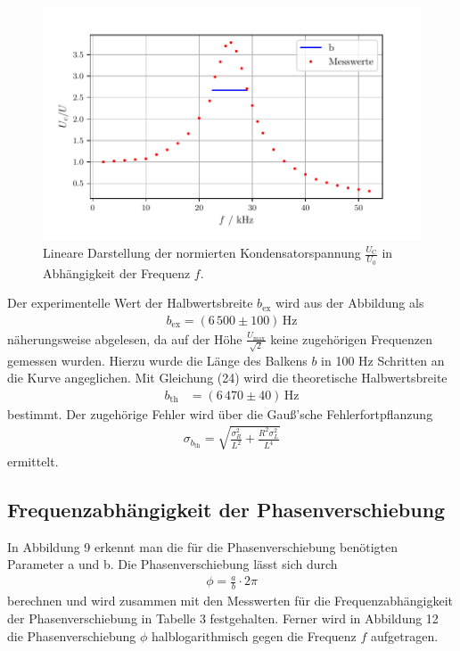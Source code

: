 \begin{figure}[H]
  \centering
  \includegraphics{plotc.pdf}
  \caption{Lineare Darstellung der normierten Kondensatorspannung $\frac{U_\text{C}}{U_\text{0}}$ in Abhängigkeit der Frequenz $f$.}
  \label{fig:Plot c}
\end{figure}

Der experimentelle Wert der Halbwertsbreite $b_\text{ex}$ wird aus der Abbildung als
\begin{align*}
b_\text{ex} = (6\,500 \pm 100)\,\si{\hertz}
\end{align*}
näherungsweise abgelesen, da auf der Höhe $\frac{U_\text{max}}{\sqrt{2}}$ keine zugehörigen Frequenzen gemessen wurden.
Hierzu wurde die Länge des Balkens $b$ in 100 Hz Schritten an die Kurve angeglichen. Mit Gleichung (24) wird die theoretische Halbwertsbreite 
\begin{align*}
b_\text{th} &= (6\,470 \pm 40)\,\si{\hertz}
\end{align*}
bestimmt. Der zugehörige Fehler wird über die Gauß'sche Fehlerfortpflanzung 
\begin{align*}
\sigma_{b_\text{th}} = \sqrt{\frac{\sigma_{R}^{2}}{ L^{2}} + \frac{R^{2} \sigma_{L}^{2}}{L^{4}}}
\end{align*}
ermittelt.


\subsection{Frequenzabhängigkeit der Phasenverschiebung}
In Abbildung 9 erkennt man die für die Phasenverschiebung benötigten Parameter a und b. Die Phasenverschiebung lässt sich durch
\begin{align*}
\phi = \frac{a}{b} \cdot 2\pi
\end{align*}
berechnen und wird zusammen mit den Messwerten für die Frequenzabhängigkeit der Phasenverschiebung in Tabelle 3 festgehalten.
Ferner wird in Abbildung 12 die Phasenverschiebung $\phi$ halblogarithmisch gegen die Frequenz $f$ aufgetragen.


